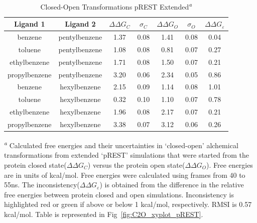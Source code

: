 \begin{table}[!htb]
\centering
\caption{Closed-Open Transformations pREST Extended\textsuperscript{\emph{a}}}
\label{tbl:C-O_pREST-40-55ns}
\begin{tabular}{|c|c|c|c|c|c|c|}
\hline
\textbf{Ligand 1}       & \textbf{Ligand 2}    & \boldmath$\Delta\Delta G_{C}$ & \boldmath$\sigma_{C}$ & \boldmath$\Delta\Delta G_{O}$ & \boldmath$\sigma_{O}$ & \boldmath$\Delta\Delta G_{\varepsilon}$ \\ \hline
benzene         & pentylbenzene & 1.37       & 0.08     & 1.41    & 0.08      & \cellcolor[HTML]{9AFF99}0.04 \\ \hline
toluene         & pentylbenzene & 1.08       & 0.08     & 0.81    & 0.07      & \cellcolor[HTML]{9AFF99}0.27 \\ \hline
ethylbenzene    & pentylbenzene & 1.71       & 0.08     & 1.50    & 0.07      & \cellcolor[HTML]{9AFF99}0.21 \\ \hline
propylbenzene & pentylbenzene & 3.20       & 0.06     & 2.34    & 0.05      & \cellcolor[HTML]{9AFF99}0.86 \\ \hline
benzene         & hexylbenzene  & 2.15       & 0.09     & 1.14    & 0.08      & \cellcolor[HTML]{FFCCC9}1.01 \\ \hline
toluene         & hexylbenzene  & 0.32       & 0.10     & 1.10    & 0.07      & \cellcolor[HTML]{9AFF99}0.78 \\ \hline
ethylbenzene    & hexylbenzene  & 1.96       & 0.08     & 2.17    & 0.07      & \cellcolor[HTML]{9AFF99}0.21 \\ \hline
propylbenzene & hexylbenzene  & 3.38       & 0.07     & 3.12    & 0.06      & \cellcolor[HTML]{9AFF99}0.26 \\ \hline
\end{tabular}

\textsuperscript{\emph{a}} Calculated free energies and their uncertainties in `closed-open' alchemical transformations from extended `pREST' simulations that were started from the protein closed state(\boldmath$\Delta\Delta G_{C}$) versus the protein open state(\boldmath$\Delta\Delta G_{O}$). 
Free energies are in units of kcal/mol.
Free energies were calculated using frames from 40 to 55ns. 
The inconsistency(\boldmath$\Delta\Delta G_{\varepsilon}$) is obtained from the difference in the relative free energies between protein closed and open simulations. 
Inconsistency is highlighted red or green if above or below 1 kcal/mol, respectively.
RMSI is 0.57 kcal/mol.
Table is represented in Fig~\ref{fig:C2O_xyplot_pREST}.
\end{table}

